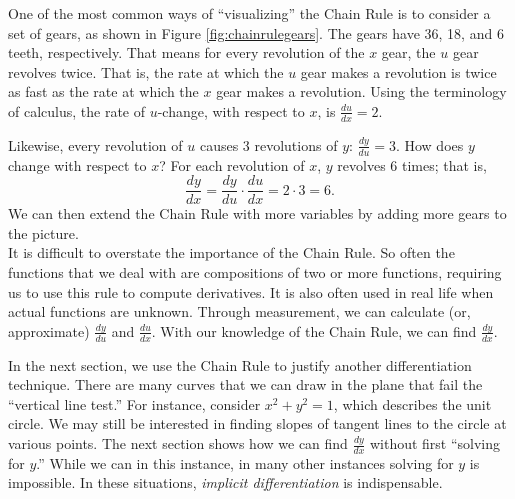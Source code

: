 One of the most common ways of 
``visualizing\primeskip'' the Chain Rule is to consider a set of gears, as shown in Figure \ref{fig:chainrulegears}. The gears have 36, 18, and 6 teeth, respectively. That means for every revolution of the $x$ gear, the $u$ gear revolves twice. That is, the rate at which the $u$ gear makes a revolution is twice as fast as the rate at which the $x$ gear makes a revolution. Using the terminology of calculus, the rate of $u$-change, with respect to $x$, is $\frac{du}{dx} = 2$. 

Likewise, every revolution of $u$ causes 3 revolutions of $y$: $\frac{dy}{du} = 3$. How does $y$ change with respect to $x$? For each revolution of $x$, $y$ revolves 6 times; that is, 
\[
\frac{dy}{dx} = \frac{dy}{du}\cdot \frac{du}{dx} = 2\cdot 3 = 6.
\]
We can then extend the Chain Rule with more variables by adding more gears to the picture.\\

It is difficult to overstate the importance of the Chain Rule. So often the functions that we deal with are compositions of two or more functions, requiring us to use this rule to compute derivatives. It is also often used in real life when actual functions are unknown. Through measurement, we can calculate (or, approximate) $\frac{dy}{du}$ and $\frac{du}{dx}$. With our knowledge of the Chain Rule, we can find $\frac{dy}{dx}$.

In the next section, we use the Chain Rule to justify another differentiation technique. There are many curves that we can draw in the plane that fail the ``vertical line test.'' For instance, consider $x^2+y^2=1$, which describes the unit circle. We may still be interested in finding slopes of tangent lines to the circle at various points. The next section shows how we can find $\frac{dy}{dx}$ without first ``solving for $y$.'' While we can in this instance, in many other instances solving for $y$ is impossible. In these situations, \emph{implicit differentiation} is indispensable. 


